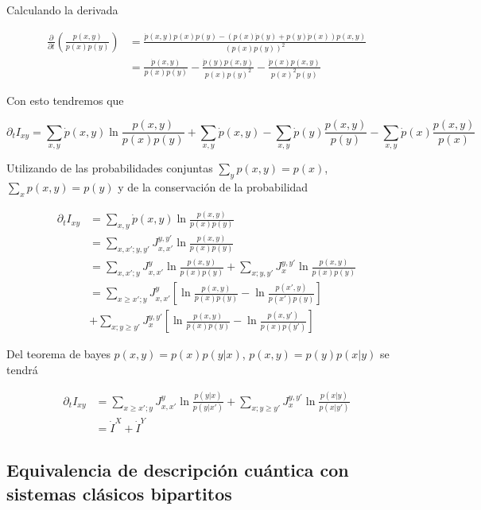 \begin{appendixs}
 Calculando la derivada

\begin{align*}
    \frac{\partial }{\partial t} \left( \frac{p(x,y)}{p(x)p(y)} \right) & = \frac{ \dot{p}(x,y)p(x)p(y) - (p(x)\dot{p}(y) + p(y)\dot{p}(x))p(x,y)   }{ (p(x)p(y))^{2} } \\
    & = \frac{\dot{p}(x,y)}{p(x)p(y) } - \frac{\dot{p}(y)p(x,y)  }{ p(x)p(y)^{2} } - \frac{\dot{p}(x)p(x,y)  }{ p(x)^{2}p(y) }  
\end{align*}

Con esto tendremos que

\begin{equation*}
    \partial_{t}I_{xy} = \sum_{x,y}\dot{p}(x,y) \ln \frac{p(x,y)}{ p(x)p(y) } + \sum_{x,y} \dot{p}(x,y) - \sum_{x,y} \dot{p}(y) \frac{p(x,y)}{p(y)} - \sum_{x,y} \dot{p}(x) \frac{p(x,y)}{p(x)} 
\end{equation*}

Utilizando de las probabilidades conjuntas $\sum_{y}p(x,y) = p(x)$, $\sum_{x}p(x,y)  = p(y)$ y de la conservación de la probabilidad

\begin{align*}
    \partial_{t}I_{xy} & = \sum_{x,y}\dot{p}(x,y) \ln \frac{p(x,y)}{ p(x)p(y) } \\
    & = \sum_{x,x';y,y'}J_{x,x'}^{y,y'} \ln \frac{p(x,y)}{ p(x)p(y) } \\
    & = \sum_{x,x';y}J_{x,x'}^{y} \ln \frac{p(x,y)}{p(x)p(y)} + \sum_{x;y,y'}J_{x}^{y,y'} \ln \frac{p(x,y)}{p(x)p(y)} \\
    & = \sum_{x\geq x';y}J_{x,x'}^{y} \left[ \ln \frac{p(x,y)}{p(x)p(y)} - \ln \frac{p(x',y)}{p(x')p(y)}  \right] \\
    & + \sum_{x;y\geq y'} J_{x}^{y,y'} \left[ \ln \frac{p(x,y)}{p(x)p(y)} - \ln \frac{p(x,y')}{p(x)p(y')} \right]
\end{align*}

Del teorema de bayes $p(x,y) = p(x)p(y|x)$, $p(x,y) = p(y)p(x|y)$ se tendrá

\begin{align*}
    \partial_{t}I_{xy} & = \sum_{x \geq x';y} J_{x,x'}^{y} \ln \frac{p(y|x) }{p(y|x')} + \sum_{x;y\geq y'} J_{x}^{y,y'} \ln \frac{p(x|y) }{p(x|y')} \\
                       & = \dot{I}^{X} + \dot{I}^{Y} 
\end{align*}

\subsection{Equivalencia de descripción cuántica con  sistemas clásicos bipartitos}


\end{appendixs}
